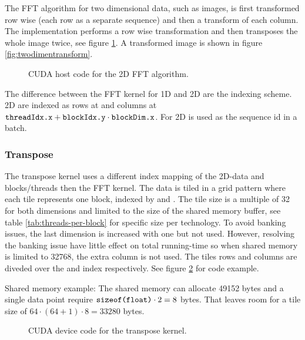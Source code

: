 The \gls{FFT} algorithm for two dimensional data, such as images, is first transformed row wise (each row as a separate sequence) and then a transform of each column. The implementation performs a row wise transformation and then transposes the whole image twice, see figure \ref{lst:cuda:host-2d-example}. A transformed image is shown in figure \ref{fig:twodimentransform}.

\begin{figure}[htbp]
	\centering
	\begin{framed}
			
	\end{framed}
	\caption{CUDA host code for the \gls{2D} \gls{FFT} algorithm.}
	\label{lst:cuda:host-2d-example}	
\end{figure}

The difference between the \gls{FFT} kernel for \gls{1D} and \gls{2D} are the indexing scheme. \gls{2D} are indexed as rows at  and columns at $\texttt{threadIdx.x} + \texttt{blockIdx.y} \cdot \texttt{blockDim.x}$. For \gls{2D}  is used as the sequence id in a batch.

\subsubsection{Transpose}

The transpose kernel uses a different index mapping of the 2D-data and blocks/threads then the \gls{FFT} kernel. The data is tiled in a grid pattern where each tile represents one block, indexed by  and . The tile size is a multiple of 32 for both dimensions and limited to the size of the shared memory buffer, see table \ref{tab:threads-per-block} for specific size per technology. To avoid banking issues, the last dimension is increased with one but not used. However, resolving the banking issue have little effect on total running-time so when shared memory is limited to 32768, the extra column is not used. The tiles rows and columns are diveded over the  and  index respectively. See figure \ref{lst:cuda:device-transpose} for code example.

Shared memory example: The {\CU} shared memory can allocate 49152 bytes and a single data point require $\texttt{sizeof(float)} \cdot 2 = 8$ bytes. That leaves room for a tile size of $64 \cdot (64 + 1) \cdot 8 = 33280$ bytes.

\begin{figure}[H]
	\centering
	\begin{framed}
			
	\end{framed}
	\caption{CUDA device code for the transpose kernel.}
	\label{lst:cuda:device-transpose}	
\end{figure}

